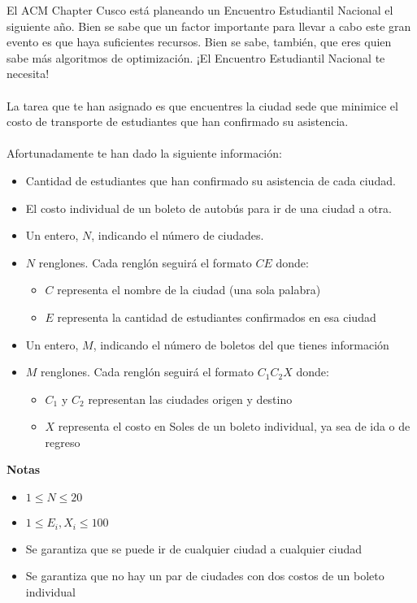 
El ACM Chapter Cusco está planeando un Encuentro Estudiantil Nacional el siguiente año. Bien se sabe que un factor importante para llevar a cabo este gran evento es que haya suficientes recursos. Bien se sabe, también, que eres quien sabe más algoritmos de optimización. ¡El Encuentro Estudiantil Nacional te necesita!
\\\\
La tarea que te han asignado es que encuentres la ciudad sede que minimice el costo de transporte de estudiantes que han confirmado su asistencia.
\\\\
Afortunadamente te han dado la siguiente información:
\begin{itemize}
    \item Cantidad de estudiantes que han confirmado su asistencia de cada ciudad.
    \item El costo individual de un boleto de autobús para ir de una ciudad a otra.
\end{itemize}


\begin{itemize}
    \item Un entero, $N$, indicando el número de ciudades.

\item $N$ renglones. Cada renglón seguirá el formato $C E$ donde:
\begin{itemize}
  \item  $C$ representa el nombre de la ciudad (una sola palabra)
  \item  $E$ representa la cantidad de estudiantes confirmados en esa ciudad
  \end{itemize}
\item Un entero, $M$, indicando el número de boletos del que tienes información
\item $M$ renglones. Cada renglón seguirá el formato $C_1 C_2 X$ donde:
\begin{itemize}
    

  \item  $C_1$ y $C_2$ representan las ciudades origen y destino
  \item  $X$ representa el costo en Soles de un boleto individual, ya sea de ida o de regreso
\end{itemize}
\end{itemize}
\textbf{Notas}
\begin{itemize}
\item  $1 \le N \le 20$
\item  $1 \le E_i, X_i \le 100$
\item  Se garantiza que se puede ir de cualquier ciudad a cualquier ciudad
\item  Se garantiza que no hay un par de ciudades con dos costos de un boleto individual
\end{itemize}

